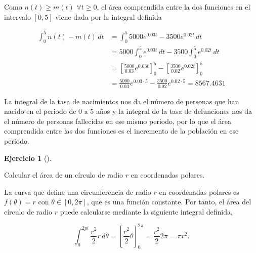 \documentclass[
  a4paper,
]{scrreport}
\theoremstyle{definition}
\newtheorem{exercise}{Ejercicio}[chapter]
\theoremstyle{remark}
\begin{document}
\begin{tcolorbox}[enhanced jigsaw, colframe=quarto-callout-tip-color-frame, colbacktitle=quarto-callout-tip-color!10!white, opacitybacktitle=0.6, left=2mm, toptitle=1mm, coltitle=black, title=\textcolor{quarto-callout-tip-color}{\faLightbulb}\hspace{0.5em}{Solución}, leftrule=.75mm, opacityback=0, toprule=.15mm, colback=white, titlerule=0mm, arc=.35mm, rightrule=.15mm, bottomrule=.15mm, breakable, bottomtitle=1mm]

Como \(n(t)\geq m(t)\) \(\forall t\geq 0\), el área comprendida entre la
dos funciones en el intervalo \([0,5]\) viene dada por la integral
definida

\begin{align*}
\int_0^5 n(t)-m(t)\,dt 
&= \int_0^5 5000e^{0.03t}-3500 e^{0.02t}\,dt\\
&= 5000\int_0^5 e^{0.03t}\,dt -3500 \int_0^5 e^{0.02t}\,dt \\
&= \left[\frac{5000}{0.03}e^{0.03t}\right]_0^5 - \left[\frac{3500}{0.02}e^{0.02t}\right]_0^5\\
&= \frac{5000}{0.03}e^{0.03\cdot 5} - \frac{3500}{0.02}e^{0.02\cdot 5}
= 8567.4631
\end{align*}

La integral de la tasa de nacimientos nos da el número de personas que
han nacido en el periodo de 0 a 5 años y la integral de la tasa de
defunciones nos da el número de personas fallecidas en ese mismo
periodo, por lo que el área comprendida entre las dos funciones es el
incremento de la población en ese periodo.

\end{tcolorbox}

\begin{exercise}[]\protect\hypertarget{exr-area-circulo-polares}{}\label{exr-area-circulo-polares}

Calcular el área de un círculo de radio \(r\) en coordenadas polares.

\end{exercise}

\begin{tcolorbox}[enhanced jigsaw, colframe=quarto-callout-tip-color-frame, colbacktitle=quarto-callout-tip-color!10!white, opacitybacktitle=0.6, left=2mm, toptitle=1mm, coltitle=black, title=\textcolor{quarto-callout-tip-color}{\faLightbulb}\hspace{0.5em}{Solución}, leftrule=.75mm, opacityback=0, toprule=.15mm, colback=white, titlerule=0mm, arc=.35mm, rightrule=.15mm, bottomrule=.15mm, breakable, bottomtitle=1mm]

La curva que define una circunferencia de radio \(r\) en coordenadas
polares es \(f(\theta)=r\) con \(\theta\in[0,2\pi]\), que es una función
constante. Por tanto, el área del círculo de radio \(r\) puede
calcularse mediante la siguiente integral definida,

\[
\int_0^{2pi} \frac{r^2}{2}r\,d\theta = \left[\frac{r^2}{2}\theta \right]_0^{2\pi} = \frac{r^2}{2}2\pi = \pi r^2.
\]

\end{tcolorbox}
\end{document}
